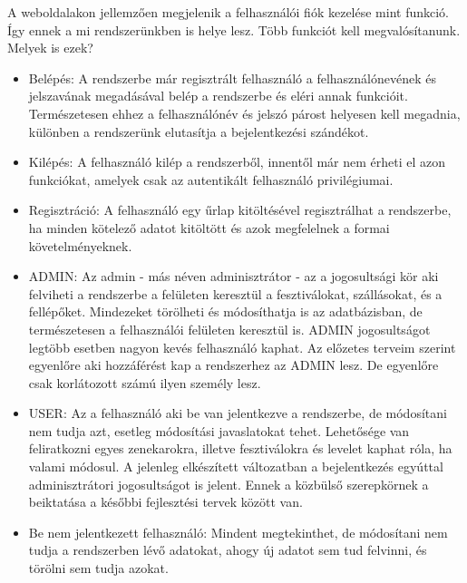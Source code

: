 
A weboldalakon jellemzően megjelenik a felhasználói fiók kezelése mint funkció. Így ennek a mi rendszerünkben is helye lesz.
Több funkciót kell megvalósítanunk. Melyek is ezek?
\begin{itemize}
\item Belépés: A rendszerbe már regisztrált felhasználó a felhasználónevének és jelszavának megadásával belép a rendszerbe és eléri annak funkcióit. Természetesen ehhez a felhasználónév és jelszó párost helyesen kell megadnia, különben a rendszerünk elutasítja a bejelentkezési szándékot.
\item Kilépés: A felhasználó kilép a rendszerből, innentől már nem érheti el azon funkciókat, amelyek csak az autentikált felhasználó privilégiumai.
\item Regisztráció: A felhasználó egy űrlap kitöltésével regisztrálhat a rendszerbe, ha minden kötelező adatot kitöltött és azok megfelelnek a formai követelményeknek.
\end{itemize}


\begin{itemize}
\item ADMIN: Az admin - más néven adminisztrátor - az a jogosultsági kör aki felviheti a rendszerbe a felületen keresztül a fesztiválokat, szállásokat, és a fellépőket. Mindezeket törölheti és módosíthatja is az adatbázisban, de természetesen a felhasználói felületen keresztül is. ADMIN jogosultságot legtöbb esetben nagyon kevés felhasználó kaphat. Az előzetes terveim szerint egyenlőre aki hozzáférést kap a rendszerhez az ADMIN lesz. De egyenlőre csak korlátozott számú ilyen személy lesz.
\item USER: Az a felhasználó aki be van jelentkezve a rendszerbe, de módosítani nem tudja azt, esetleg módosítási javaslatokat tehet. Lehetősége van feliratkozni egyes zenekarokra, illetve fesztiválokra és levelet kaphat róla, ha valami módosul.
A jelenleg elkészített változatban a bejelentkezés egyúttal adminisztrátori jogosultságot is jelent. Ennek a közbülső szerepkörnek a beiktatása a későbbi fejlesztési tervek között van.
\item Be nem jelentkezett felhasználó: Mindent megtekinthet, de módosítani nem tudja a rendszerben lévő adatokat, ahogy új adatot sem tud felvinni, és törölni sem tudja azokat.
\end{itemize}


